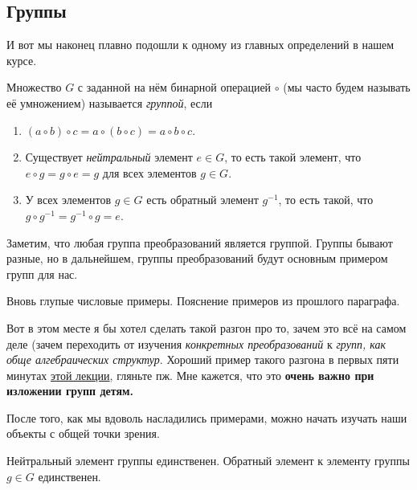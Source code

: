 \subsection{Группы}

	И вот мы наконец плавно подошли к одному из главных определений в нашем курсе. 

	\begin{definition} 
		Множество $G$ с заданной на нём бинарной операцией $\circ$ (мы часто будем называть её умножением) называется \emph{группой}, если 
		\begin{enumerate}
			\item $(a \circ b) \circ c = a \circ (b \circ c) = a \circ b \circ c$. 
			\item Существует \emph{нейтральный} элемент $e \in G$, то есть такой элемент, что $e \circ g = g \circ e = g$ для всех элементов $g \in G$. 
			\item У всех элементов $g \in G$ есть обратный элемент $g^{-1}$, то есть такой, что $g \circ g^{-1} = g^{-1} \circ g = e$.
		\end{enumerate}
	\end{definition}

	\begin{remark}
		Заметим, что любая группа преобразований является группой. Группы бывают разные, но в дальнейшем, группы преобразований будут основным примером групп для нас. 
	\end{remark}

	\begin{example}
		Вновь глупые числовые примеры. Пояснение примеров из прошлого параграфа. 
	\end{example}

	\begin{remark}
		Вот в этом месте я бы хотел сделать такой разгон про то, зачем это всё на самом деле (зачем переходить от изучения \emph{конкретных преобразований} к \emph{групп, как обще алгебраических структур}. Хороший пример такого разгона в первых пяти минутах \href{https://www.youtube.com/watch?v=NKZ_2EzHaSI}{этой лекции}, гляньте пж. Мне кажется, что это \bf{очень важно} при изложении групп детям. 
	\end{remark} 

	После того, как мы вдоволь насладились примерами, можно начать изучать наши объекты с общей точки зрения. 

	\begin{observation} 
		Нейтральный элемент группы единственен. Обратный элемент к элементу группы $g \in G$ единственен. 
	\end{observation}

